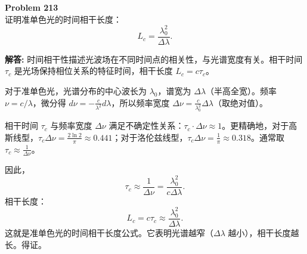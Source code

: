 \documentclass[12pt, a4paper, oneside]{ctexart}
\newenvironment{solution}{\par\noindent\textbf{解答:}\quad}{\par}
\begin{document}
\begin{mdframed}[backgroundcolor=gray!10, linewidth=0pt]
    \textbf{Problem 213} \\
    证明准单色光的时间相干长度：
    \[
    L_c = \frac{\lambda_0^2}{\Delta\lambda}.
    \]
\end{mdframed}
\begin{solution}
    时间相干性描述光波场在不同时间点的相关性，与光谱宽度有关。相干时间 $\tau_c$ 是光场保持相位关系的特征时间，相干长度 $L_c = c \tau_c$。

    对于准单色光，光谱分布的中心波长为 $\lambda_0$，谱宽为 $\Delta\lambda$（半高全宽）。频率 $\nu = c/\lambda$，微分得 $d\nu = -\frac{c}{\lambda^2} d\lambda$，所以频率宽度 $\Delta\nu = \frac{c}{\lambda_0^2} \Delta\lambda$（取绝对值）。

    相干时间 $\tau_c$ 与频率宽度 $\Delta\nu$ 满足不确定性关系：$\tau_c \cdot \Delta\nu \approx 1$。更精确地，对于高斯线型，$\tau_c \Delta\nu = \frac{2\ln2}{\pi} \approx 0.441$；对于洛伦兹线型，$\tau_c \Delta\nu = \frac{1}{\pi} \approx 0.318$。通常取 $\tau_c \approx \frac{1}{\Delta\nu}$。

    因此，
    \[
    \tau_c \approx \frac{1}{\Delta\nu} = \frac{\lambda_0^2}{c \Delta\lambda}.
    \]
    相干长度：
    \[
    L_c = c \tau_c \approx \frac{\lambda_0^2}{\Delta\lambda}.
    \]
    这就是准单色光的时间相干长度公式。它表明光谱越窄（$\Delta\lambda$ 越小），相干长度越长。得证。
\end{solution}
\end{document}
